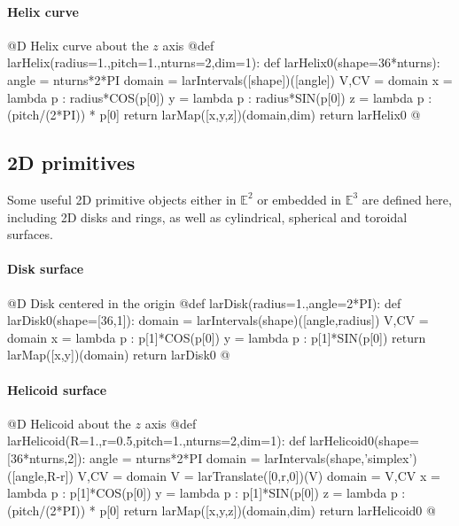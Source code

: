 \documentclass[11pt,oneside]{article}	%
\def\E{\mathbb{E}}
\begin{document}
\paragraph{Helix curve}
@D Helix curve about the $z$ axis
@{def larHelix(radius=1.,pitch=1.,nturns=2,dim=1):
	def larHelix0(shape=36*nturns):
		angle = nturns*2*PI
		domain = larIntervals([shape])([angle])
		V,CV = domain
		x = lambda p : radius*COS(p[0])
		y = lambda p : radius*SIN(p[0])
		z = lambda p : (pitch/(2*PI)) * p[0]
		return larMap([x,y,z])(domain,dim)
	return larHelix0
@}
\subsection{2D primitives}
Some useful 2D primitive objects either in $\E^2$ or embedded in $\E^3$ are defined here, including 2D disks and rings, as well as cylindrical, spherical and toroidal surfaces.

\paragraph{Disk surface}
@D Disk centered in the origin
@{def larDisk(radius=1.,angle=2*PI):
	def larDisk0(shape=[36,1]):
		domain = larIntervals(shape)([angle,radius])
		V,CV = domain
		x = lambda p : p[1]*COS(p[0])
		y = lambda p : p[1]*SIN(p[0])
		return larMap([x,y])(domain)
	return larDisk0
@}
\paragraph{Helicoid surface}
@D Helicoid about the $z$ axis
@{def larHelicoid(R=1.,r=0.5,pitch=1.,nturns=2,dim=1):
	def larHelicoid0(shape=[36*nturns,2]):
		angle = nturns*2*PI
		domain = larIntervals(shape,'simplex')([angle,R-r])
		V,CV = domain
		V = larTranslate([0,r,0])(V)
		domain = V,CV
		x = lambda p : p[1]*COS(p[0])
		y = lambda p : p[1]*SIN(p[0])
		z = lambda p : (pitch/(2*PI)) * p[0]
		return larMap([x,y,z])(domain,dim)
	return larHelicoid0
@}
\end{document}
